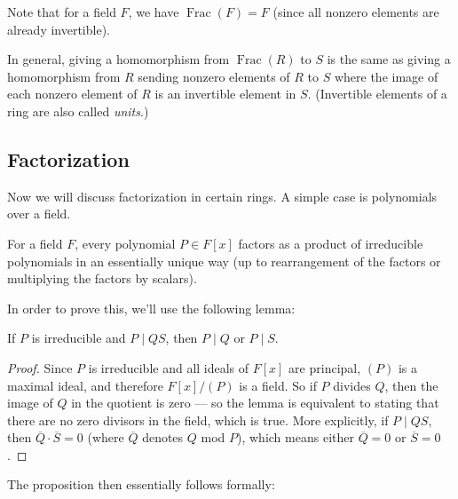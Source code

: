 Note that for a field $F$, we have $\operatorname{Frac}(F) = F$ (since all nonzero elements are already invertible). 

In general, giving a homomorphism from $\operatorname{Frac}(R)$ to $S$ is the same as giving a homomorphism from $R$ sending nonzero elements of $R$ to $S$ where the image of each nonzero element of $R$ is an invertible element in $S$. (Invertible elements of a ring are also called \emph{units}.) 



\subsection{Factorization}

Now we will discuss factorization in certain rings. A simple case is polynomials over a field.  

\begin{proposition}\label{factor}
For a field $F$, every polynomial $P \in F[x]$ factors as a product of irreducible polynomials in an essentially unique way (up to rearrangement of the factors or multiplying the factors by scalars).
\end{proposition}

In order to prove this, we'll use the following lemma:

\begin{lemma}\label{lemma factor}
If $P$ is irreducible and $P \mid QS$, then $P \mid Q$ or $P \mid S$.
\end{lemma}

\begin{proof}
Since $P$ is irreducible and all ideals of $F[x]$ are principal, $(P)$ is a maximal ideal, and therefore $F[x]/(P)$ is a field. So if $P$ divides $Q$, then the image of $Q$ in the quotient is zero --- so the lemma is equivalent to stating that there are no zero divisors in the field, which is true. More explicitly, if $P \mid QS$, then $\overline{Q}\cdot \overline{S} = 0$ (where $\overline{Q}$ denotes $Q$ mod $P$), which means either $\overline{Q} = 0$ or $\overline{S} = 0$.
\end{proof}

The proposition then essentially follows formally:

